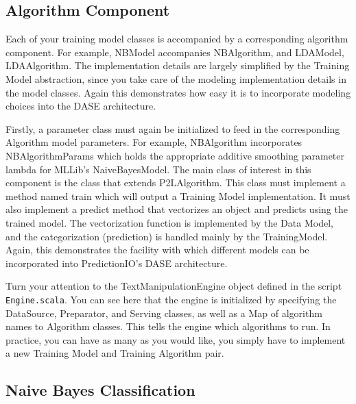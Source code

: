 \documentclass[a4paper,12pt]{article}
\renewcommand{\tt}[1]{\texttt{#1}}
\newcommand{\3}{\left}
\newcommand{\4}{\right}
\renewcommand{\-}[1]{{}^{-#1}}
\begin{document}
\subsection*{Algorithm Component}

Each of your training model classes is accompanied by a corresponding algorithm component. For example, NBModel accompanies NBAlgorithm, and LDAModel, LDAAlgorithm. The implementation details are largely simplified by the Training Model abstraction, since you take care of the modeling implementation details in the model classes. Again this demonstrates how easy it is to incorporate modeling choices into the DASE architecture. 

Firstly, a parameter class must again be initialized to feed in the corresponding Algorithm model parameters. For example, NBAlgorithm incorporates NBAlgorithmParams which holds the appropriate additive smoothing parameter lambda for MLLib's NaiveBayesModel. The main class of interest in this component is the class that extends P2LAlgorithm.
 This class must implement a method named train which will output a Training Model implementation. It must also implement a predict method that vectorizes an object and predicts using the trained model. The vectorization function is implemented by the Data Model, and the categorization (prediction) is handled mainly by the TrainingModel. Again, this demonstrates the facility with which different models can be incorporated into PredictionIO's DASE architecture.
 
Turn your attention to the TextManipulationEngine object defined in the script \tt{Engine.scala}. You can see here that the engine is initialized by specifying the DataSource, Preparator, and Serving classes, as well as a Map of algorithm names to Algorithm classes. This tells the engine which algorithms to run. In practice, you can have as many as you would like, you simply have to implement a new Training Model and Training Algorithm pair. 


\subsection*{Naive Bayes Classification}
\end{document}
